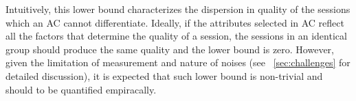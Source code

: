 

Intuitively, this lower bound characterizes the dispersion in quality of the sessions which an AC cannot differentiate. Ideally, if the attributes selected in AC reflect all the factors that determine the quality of a session, the sessions in an identical group should produce the same quality and the lower bound is zero. However, given the limitation of measurement and nature of noises (see \Section~\ref{sec:challenges} for detailed discussion), it is expected that such lower bound is non-trivial and should to be quantified empiracally.





